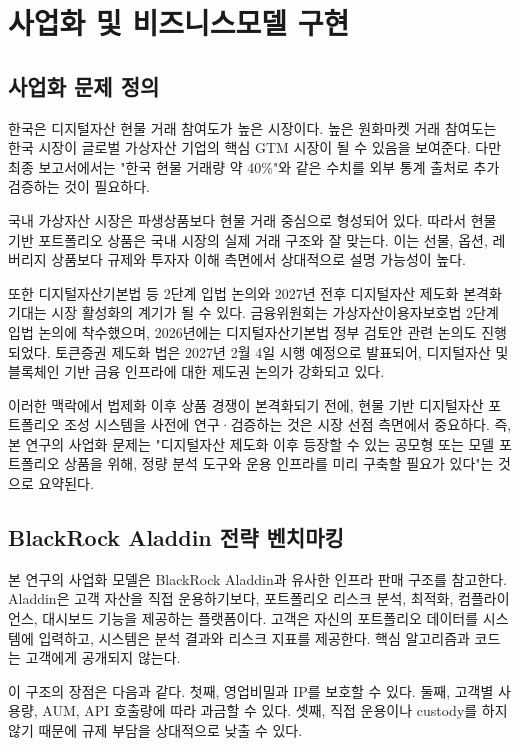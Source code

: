 \documentclass[12pt,a4paper]{article}
\begin{document}
\section{사업화 및 비즈니스모델 구현}

\subsection{사업화 문제 정의}

한국은 디지털자산 현물 거래 참여도가 높은 시장이다. 높은 원화마켓 거래 참여도는 한국 시장이 글로벌 가상자산 기업의 핵심 GTM 시장이 될 수 있음을 보여준다. 다만 최종 보고서에서는 "한국 현물 거래량 약 40\%"와 같은 수치를 외부 통계 출처로 추가 검증하는 것이 필요하다.

국내 가상자산 시장은 파생상품보다 현물 거래 중심으로 형성되어 있다. 따라서 현물 기반 포트폴리오 상품은 국내 시장의 실제 거래 구조와 잘 맞는다. 이는 선물, 옵션, 레버리지 상품보다 규제와 투자자 이해 측면에서 상대적으로 설명 가능성이 높다.

또한 디지털자산기본법 등 2단계 입법 논의와 2027년 전후 디지털자산 제도화 본격화 기대는 시장 활성화의 계기가 될 수 있다. 금융위원회는 가상자산이용자보호법 2단계 입법 논의에 착수했으며, 2026년에는 디지털자산기본법 정부 검토안 관련 논의도 진행되었다. 토큰증권 제도화 법은 2027년 2월 4일 시행 예정으로 발표되어, 디지털자산 및 블록체인 기반 금융 인프라에 대한 제도권 논의가 강화되고 있다.

이러한 맥락에서 법제화 이후 상품 경쟁이 본격화되기 전에, 현물 기반 디지털자산 포트폴리오 조성 시스템을 사전에 연구·검증하는 것은 시장 선점 측면에서 중요하다. 즉, 본 연구의 사업화 문제는 "디지털자산 제도화 이후 등장할 수 있는 공모형 또는 모델 포트폴리오 상품을 위해, 정량 분석 도구와 운용 인프라를 미리 구축할 필요가 있다"는 것으로 요약된다.


\subsection{BlackRock Aladdin 전략 벤치마킹}

본 연구의 사업화 모델은 BlackRock Aladdin과 유사한 인프라 판매 구조를 참고한다. Aladdin은 고객 자산을 직접 운용하기보다, 포트폴리오 리스크 분석, 최적화, 컴플라이언스, 대시보드 기능을 제공하는 플랫폼이다. 고객은 자신의 포트폴리오 데이터를 시스템에 입력하고, 시스템은 분석 결과와 리스크 지표를 제공한다. 핵심 알고리즘과 코드는 고객에게 공개되지 않는다.

이 구조의 장점은 다음과 같다. 첫째, 영업비밀과 IP를 보호할 수 있다. 둘째, 고객별 사용량, AUM, API 호출량에 따라 과금할 수 있다. 셋째, 직접 운용이나 custody를 하지 않기 때문에 규제 부담을 상대적으로 낮출 수 있다.
\end{document}

